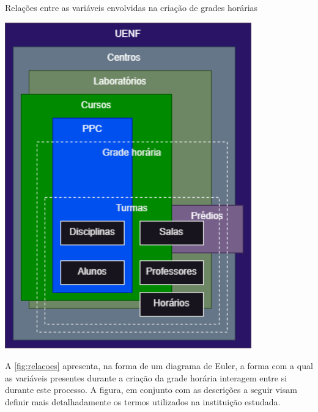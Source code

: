 \begin{MyCenteredFigure} \caption{Relações entre as variáveis envolvidas na criação de grades horárias} \label{fig:relacoes}
  \includegraphics[width=0.8\textwidth]{files/img/2.02!3-instituicao/Diagramas Unificados-Euler-Relações entre as variáveis.png}
\end{MyCenteredFigure}

A \autoref{fig:relacoes} apresenta, na forma de um diagrama de Euler, a forma com a qual as variáveis presentes durante a criação da grade horária interagem entre si durante este processo. A figura, em conjunto com as descrições a seguir visam definir mais detalhadamente os termos utilizados na instituição estudada.

